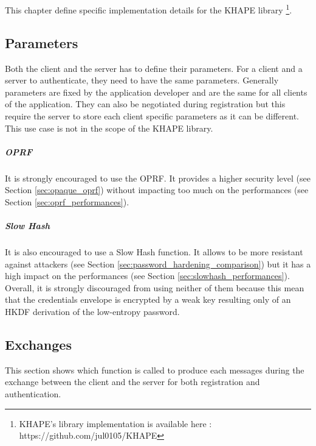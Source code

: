 ﻿\documentclass[../report.tex]{subfiles}
\begin{document}
\chapter{} \label{cha:implementation}
This chapter define specific implementation details for the KHAPE library \footnote{KHAPE's library implementation is available here : https://github.com/jul0105/KHAPE}.
\section{Parameters}
Both the client and the server has to define their parameters. For a client and a server to authenticate, they need to have the same parameters. 
Generally parameters are fixed by the application developer and are the same for all clients of the application.
They can also be negotiated during registration but this require the server to store each client specific parameters as it can be different. This use case is not in the scope of the KHAPE library.
\paragraph{OPRF}
It is strongly encouraged to use the OPRF.
It provides a higher security level (see Section \ref{sec:opaque_oprf}) without impacting too much on the performances (see Section \ref{sec:oprf_performances}).

\paragraph{Slow Hash}
It is also encouraged to use a Slow Hash function. It allows to be more resistant against attackers (see Section \ref{sec:password_hardening_comparison}) but it has a high impact on the performances (see Section \ref{sec:slowhash_performances}).
Overall, it is strongly discouraged from using neither of them because this mean that the credentials envelope is encrypted by a weak key resulting only of an HKDF derivation of the low-entropy password.

\section{Exchanges}
This section shows which function is called to produce each messages during the exchange between the client and the server for both registration and authentication.
\end{document}
